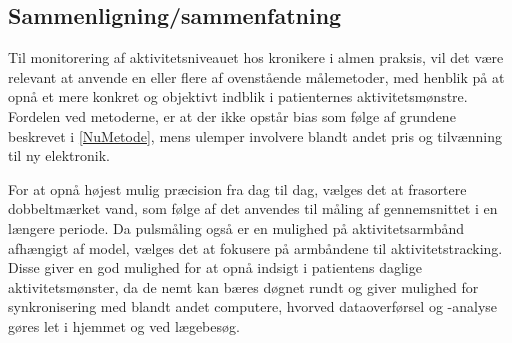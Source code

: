\subsection{Sammenligning/sammenfatning}

Til monitorering af aktivitetsniveauet hos kronikere i almen praksis, vil det være relevant at anvende en eller flere af ovenstående målemetoder, med henblik på at opnå et mere konkret og objektivt indblik i patienternes aktivitetsmønstre. Fordelen ved metoderne, er at der ikke opstår bias som følge af grundene beskrevet i \autoref{NuMetode}, mens ulemper involvere blandt andet pris og tilvænning til ny elektronik. 

For at opnå højest mulig præcision fra dag til dag, vælges det at frasortere dobbeltmærket vand, som følge af det anvendes til måling af gennemsnittet i en længere periode. Da pulsmåling også er en mulighed på aktivitetsarmbånd afhængigt af model, vælges det at fokusere på armbåndene til aktivitetstracking. Disse giver en god mulighed for at opnå indsigt i patientens daglige aktivitetsmønster, da de nemt kan bæres døgnet rundt og giver mulighed for synkronisering med blandt andet computere, hvorved dataoverførsel og -analyse gøres let i hjemmet og ved lægebesøg.












